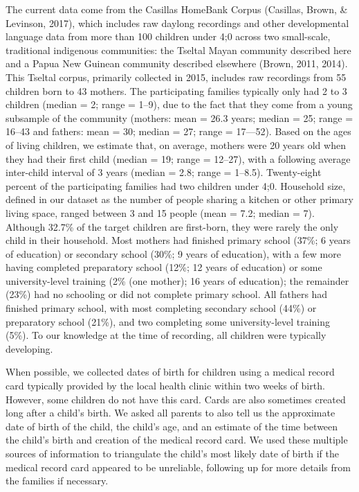 \documentclass[floatsintext,man]{apa6}
\theoremstyle{definition}
\theoremstyle{definition}
\theoremstyle{definition}
\theoremstyle{remark}
\begin{document}
The current data come from the Casillas HomeBank Corpus (Casillas,
Brown, \& Levinson, 2017), which includes raw daylong recordings and
other developmental language data from more than 100 children under 4;0
across two small-scale, traditional indigenous communities: the Tseltal
Mayan community described here and a Papua New Guinean community
described elsewhere (Brown, 2011, 2014). This Tseltal corpus, primarily
collected in 2015, includes raw recordings from 55 children born to 43
mothers. The participating families typically only had 2 to 3 children
(median = 2; range = 1--9), due to the fact that they come from a young
subsample of the community (mothers: mean = 26.3 years; median = 25;
range = 16--43 and fathers: mean = 30; median = 27; range = 17---52).
Based on the ages of living children, we estimate that, on average,
mothers were 20 years old when they had their first child (median = 19;
range = 12--27), with a following average inter-child interval of 3
years (median = 2.8; range = 1--8.5). Twenty-eight percent of the
participating families had two children under 4;0. Household size,
defined in our dataset as the number of people sharing a kitchen or
other primary living space, ranged between 3 and 15 people (mean = 7.2;
median = 7). Although 32.7\% of the target children are first-born, they
were rarely the only child in their household. Most mothers had finished
primary school (37\%; 6 years of education) or secondary school (30\%; 9
years of education), with a few more having completed preparatory school
(12\%; 12 years of education) or some university-level training (2\%
(one mother); 16 years of education); the remainder (23\%) had no
schooling or did not complete primary school. All fathers had finished
primary school, with most completing secondary school (44\%) or
preparatory school (21\%), and two completing some university-level
training (5\%). To our knowledge at the time of recording, all children
were typically developing.

When possible, we collected dates of birth for children using a medical
record card typically provided by the local health clinic within two
weeks of birth. However, some children do not have this card. Cards are
also sometimes created long after a child's birth. We asked all parents
to also tell us the approximate date of birth of the child, the child's
age, and an estimate of the time between the child's birth and creation
of the medical record card. We used these multiple sources of
information to triangulate the child's most likely date of birth if the
medical record card appeared to be unreliable, following up for more
details from the families if necessary.
\end{document}
